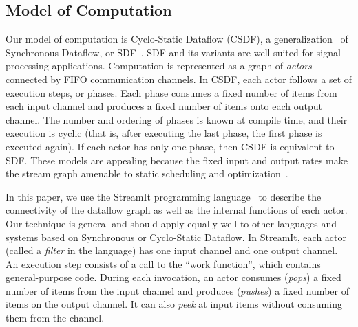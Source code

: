 \documentclass{sig-alternate}
\begin{document}

\subsection{Model of Computation}
\label{sec:sdf}


Our model of computation is Cyclo-Static Dataflow (CSDF), a
generalization~\cite{BELP96} of Synchronous Dataflow, or
SDF~\cite{LM87-i}.  SDF and its variants are well suited for signal
processing applications. Computation is represented as a graph of {\it
actors} connected by FIFO communication channels.  In CSDF, each actor
follows a set of execution steps, or phases.  Each phase consumes a
fixed number of items from each input channel and produces a fixed
number of items onto each output channel.  The number and ordering of
phases is known at compile time, and their execution is cyclic (that
is, after executing the last phase, the first phase is executed
again).  If each actor has only one phase, then CSDF is equivalent to
SDF.  These models are appealing because the fixed input and output
rates make the stream graph amenable to static scheduling and
optimization~\cite{LM87-i}.

In this paper, we use the StreamIt programming
language~\cite{streamitcc} to describe the connectivity of the
dataflow graph as well as the internal functions of each actor.  Our
technique is general and should apply equally well to other languages
and systems based on Synchronous or Cyclo-Static Dataflow.  In
StreamIt, each actor (called a {\it filter} in the language) has one
input channel and one output channel.  An execution step consists of a
call to the ``work function'', which contains general-purpose code.
During each invocation, an actor consumes ({\it pops}) a fixed number
of items from the input channel and produces ({\it pushes}) a fixed
number of items on the output channel.  It can also {\it peek} at
input items without consuming them from the channel.
\end{document}
